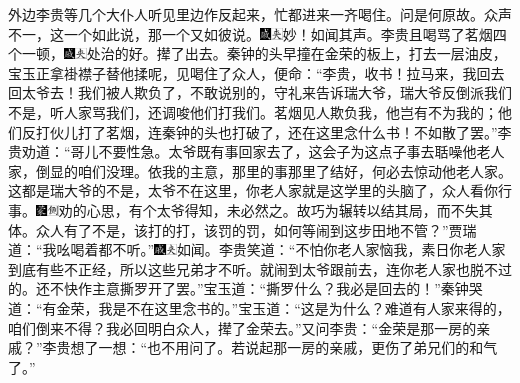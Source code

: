 外边李贵等几个大仆人听见里边作反起来，忙都进来一齐喝住。问是何原故。众声不一，这一个如此说，那一个又如彼说。{\includegraphics[width=3mm]{../Images/00005}\includegraphics[width=3mm]{../Images/00012}\footnotesize \kaishu 妙！如闻其声。}李贵且喝骂了茗烟四个一顿，{\includegraphics[width=3mm]{../Images/00005}\includegraphics[width=3mm]{../Images/00012}\footnotesize \kaishu 处治的好。}撵了出去。秦钟的头早撞在金荣的板上，打去一层油皮，宝玉正拿褂襟子替他揉呢，见喝住了众人，便命：“李贵，收书！拉马来，我回去回太爷去！我们被人欺负了，不敢说别的，守礼来告诉瑞大爷，瑞大爷反倒派我们不是，听人家骂我们，还调唆他们打我们。茗烟见人欺负我，他岂有不为我的；他们反打伙儿打了茗烟，连秦钟的头也打破了，还在这里念什么书！不如散了罢。”李贵劝道：“哥儿不要性急。太爷既有事回家去了，这会子为这点子事去聒噪他老人家，倒显的咱们没理。依我的主意，那里的事那里了结好，何必去惊动他老人家。这都是瑞大爷的不是，太爷不在这里，你老人家就是这学里的头脑了，众人看你行事。{\includegraphics[width=3mm]{../Images/00006}\includegraphics[width=3mm]{../Images/00011}\footnotesize \kaishu 劝的心思，有个太爷得知，未必然之。故巧为辗转以结其局，而不失其体。}众人有了不是，该打的打，该罚的罚，如何等闹到这步田地不管？”贾瑞道：“我吆喝着都不听。”{\includegraphics[width=3mm]{../Images/00005}\includegraphics[width=3mm]{../Images/00012}\footnotesize \kaishu 如闻。}李贵笑道：“不怕你老人家恼我，素日你老人家到底有些不正经，所以这些兄弟才不听。就闹到太爷跟前去，连你老人家也脱不过的。还不快作主意撕罗开了罢。”宝玉道：“撕罗什么？我必是回去的！”秦钟哭道：“有金荣，我是不在这里念书的。”宝玉道：“这是为什么？难道有人家来得的，咱们倒来不得？我必回明白众人，撵了金荣去。”又问李贵：“金荣是那一房的亲戚？”李贵想了一想：“也不用问了。若说起那一房的亲戚，更伤了弟兄们的和气了。”

